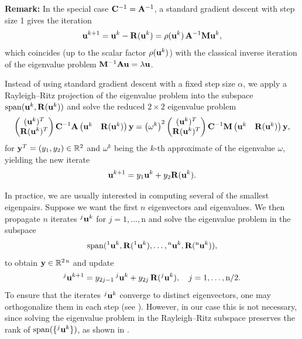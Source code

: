 \begin{itshape}
    \textbf{Remark:} In the special case $\mathbf{C}^{-1}=\mathbf{A}^{-1}$, a standard gradient descent with step size 1 gives the iteration
    \[
    \mathbf{u}^{k+1} = \mathbf{u}^k - \mathbf{R}(\mathbf{u}^k) = \rho(\mathbf{u}^k)\, \mathbf{A}^{-1}\mathbf{M} \mathbf{u}^k,
    \]
    which coincides (up to the scalar factor $\rho(\mathbf{u}^k)$) with the classical inverse iteration of the eigenvalue problem $\mathbf{M}^{-1}\mathbf{A}\mathbf{u}=\lambda\mathbf{u}$.
\end{itshape}

Instead of using standard gradient descent with a fixed step size $\alpha$, we apply a Rayleigh–Ritz projection of the eigenvalue problem into the subspace $\mathrm{span}(\mathbf{u}^k, \mathbf{R}(\mathbf{u}^k))$ and solve the reduced $2\times 2$ eigenvalue problem
\begin{equation*}
    \begin{pmatrix}
        (\mathbf{u}^k)^T\\
        \mathbf{R}(\mathbf{u}^k)^T
    \end{pmatrix}
    \mathbf{C}^{-1}\mathbf{A}
    \begin{pmatrix}
        \mathbf{u}^k & \mathbf{R}(\mathbf{u}^k)
    \end{pmatrix}
    \mathbf{y}
    =
    \left(\omega^k\right)^2
    \begin{pmatrix}
        (\mathbf{u}^k)^T\\
        \mathbf{R}(\mathbf{u}^k)^T
    \end{pmatrix}
    \mathbf{C}^{-1}\mathbf{M}
    \begin{pmatrix}
        \mathbf{u}^k & \mathbf{R}(\mathbf{u}^k)
    \end{pmatrix}
    \mathbf{y},
\end{equation*}
for $\mathbf{y}^T=(y_1,y_2) \in \mathbb{R}^2$ and $\omega^k$ being the $k$-th approximate of the eigenvalue $\omega$, yielding the new iterate
\[
\mathbf{u}^{k+1} = y_1 \mathbf{u}^k + y_2 \mathbf{R}(\mathbf{u}^k).
\]

In practice, we are usually interested in computing several of the smallest eigenpairs. Suppose we want the first $n$ eigenvectors and eigenvalues. We then propagate $n$ iterates ${}^{j}\mathbf{u}^k$ for $j=1,\ldots,\mathrm{n}$ and solve the eigenvalue problem in the subspace
\[
\mathrm{span}({}^{1}\mathbf{u}^k, \mathbf{R}({}^{1}\mathbf{u}^k), \ldots, {}^{\mathrm{n}}\mathbf{u}^k, \mathbf{R}({}^{\mathrm{n}}\mathbf{u}^k)),
\]
to obtain $\mathbf{y} \in \mathbb{R}^{2\,\mathrm{n}}$ and update
\[
{}^{j}\mathbf{u}^{k+1} = y_{2j-1}\, {}^{j}\mathbf{u}^k + y_{2j}\, \mathbf{R}({}^{j}\mathbf{u}^k), \quad j=1,\ldots,\mathrm{n/2}.
\]
To ensure that the iterates ${}^{j}\mathbf{u}^k$ converge to distinct eigenvectors, one may orthogonalize them in each step (see \cite{Melenk21}). However, in our case this is not necessary, since solving the eigenvalue problem in the Rayleigh–Ritz subspace preserves the rank of $\mathrm{span}(\{{}^{j}\mathbf{u}^k\})$, as shown in \cite[Lemma 3.1]{Neymeyr02}.







